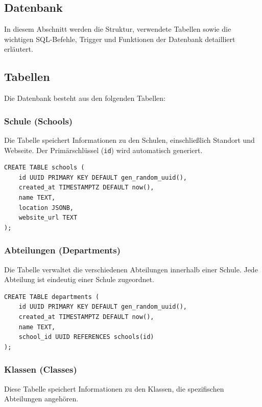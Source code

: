 \begin{inhalt}
\renewcommand*\chapterpagestyle{scrheadings}
\chapter{Datenbank}

In diesem Abschnitt werden die Struktur, verwendete Tabellen sowie die wichtigen SQL-Befehle, Trigger und Funktionen der Datenbank detailliert erläutert.

\section{Tabellen}

Die Datenbank besteht aus den folgenden Tabellen:

\subsection{Schule (Schools)}
Die Tabelle speichert Informationen zu den Schulen, einschließlich Standort und Webseite. Der Primärschlüssel (\texttt{id}) wird automatisch generiert.

\begin{lstlisting}[style=mysql]
CREATE TABLE schools (
    id UUID PRIMARY KEY DEFAULT gen_random_uuid(),
    created_at TIMESTAMPTZ DEFAULT now(),
    name TEXT,
    location JSONB,
    website_url TEXT
);
\end{lstlisting}

\subsection{Abteilungen (Departments)}
Die Tabelle verwaltet die verschiedenen Abteilungen innerhalb einer Schule. Jede Abteilung ist eindeutig einer Schule zugeordnet.

\begin{lstlisting}[style=mysql]
CREATE TABLE departments (
    id UUID PRIMARY KEY DEFAULT gen_random_uuid(),
    created_at TIMESTAMPTZ DEFAULT now(),
    name TEXT,
    school_id UUID REFERENCES schools(id)
);
\end{lstlisting}

\subsection{Klassen (Classes)}
Diese Tabelle speichert Informationen zu den Klassen, die spezifischen Abteilungen angehören.


\end{inhalt}
